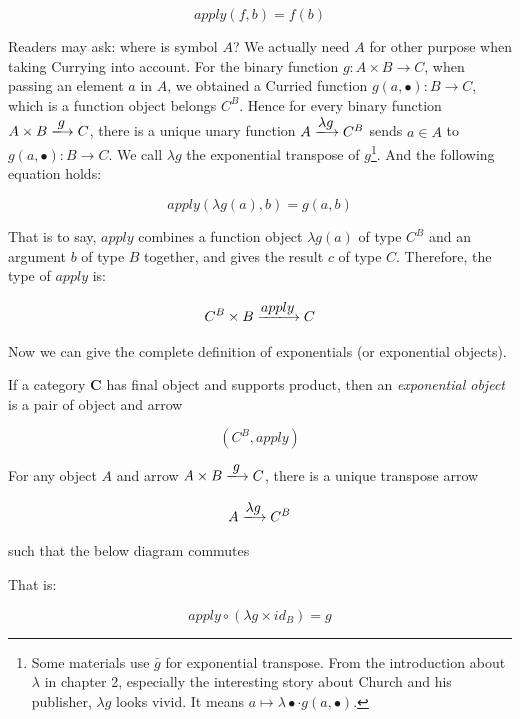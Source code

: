 \documentclass[b5paper]{article}
\begin{document}
\[
apply(f, b) = f(b)
\]

Readers may ask: where is symbol $A$? We actually need $A$ for other purpose when taking Currying into account. For the binary function $g: A \times B \to C$, when passing an element $a$ in $A$, we obtained a Curried function $g(a, \bullet) : B \to C$, which is a function object belongs $C^B$. Hence for every binary function $A \times B \arrowto{g} C$, there is a unique unary function $A \arrowto{\lambda g} C^B$ sends $a \in A$ to $g(a, \bullet) : B \to C$. We call $\lambda g$ the exponential transpose of $g$\footnote{Some materials use $\bar{g}$ for exponential transpose. From the introduction about $\lambda$ in chapter 2, especially the interesting story about Church and his publisher, $\lambda g$ looks vivid. It means $a \mapsto \lambda \bullet \cdot g(a, \bullet)$.}. And the following equation holds:

\[
apply(\lambda g(a), b) = g(a, b)
\]

That is to say, $apply$ combines a function object $\lambda g(a)$ of type $C^B$ and an argument $b$ of type $B$ together, and gives the result $c$ of type $C$. Therefore, the type of $apply$ is:

\[
C^B \times B \arrowto{apply} C
\]

 
Now we can give the complete definition of exponentials (or exponential objects).

\begin{definition}
\normalfont
If a category $\pmb{C}$ has final object and supports product, then an {\em exponential object} is a pair of object and arrow

\[
(C^B, apply)
\]

For any object $A$ and arrow $A \times B \arrowto{g} C$, there is a unique transpose arrow

\[
 A \arrowto{\lambda g} C^B
\]

such that the below diagram commutes

\begin{center}
\end{center}

That is:

\[
  apply \circ (\lambda g \times id_B) = g
\]

\end{definition}
\end{document}
